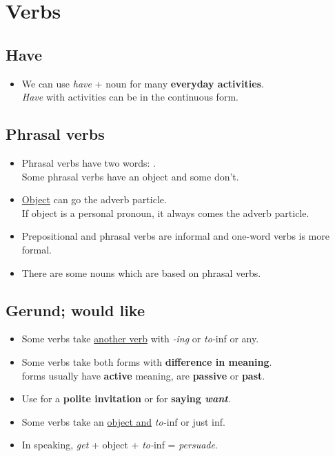 \section{Verbs}

\subsection{Have}
\begin{itemize}
    \item We can use \textit{have} + noun for many \textbf{everyday activities}.\\
    \textit{Have} with activities can be in the continuous form.
\end{itemize}

\subsection{Phrasal verbs}
\begin{itemize}
    \item Phrasal verbs have two words: .\\
    Some phrasal verbs have an object and some don't.
    \item \underline{Object} can go  the adverb particle.\\
    If object is a personal pronoun, it always comes  the adverb particle.
    \item[\ast] Prepositional and phrasal verbs are informal and one-word verbs is more formal.
    \item[\aast] There are some nouns which are based on phrasal verbs.
\end{itemize}

\subsection{Gerund; would like}
\begin{itemize}
    \item Some verbs take \underline{another verb} with \textit{-ing} or \textit{to-}inf or any.
    \item Some verbs take both forms with \textbf{difference in meaning}.\\
     forms usually have \textbf{active} meaning,  are \textbf{passive} or \textbf{past}.
    \item Use 
    for a \textbf{polite invitation} or for \textbf{saying \textit{want}}.
    \item[\doot] Some verbs take an \underline{object and} \textit{to-}inf or just inf.
    \item[\aast] In speaking, \textit{get} + object + \textit{to-}inf = \textit{persuade}.
\end{itemize}

